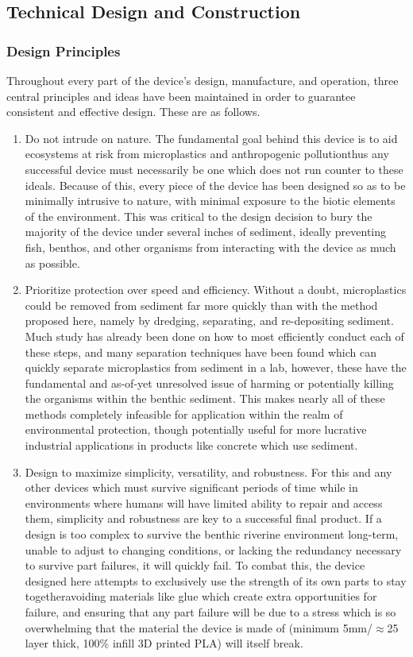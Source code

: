 \documentclass[fleqn,10pt]{SelfArx} %
\begin{document}
	\subsection{Technical Design and Construction}
	\label{subsec:TechDesign}
	\subsubsection{Design Principles}
	
	Throughout every part of the device’s design, manufacture, and operation, three central principles and ideas have been maintained in order to guarantee consistent and effective design. These are as follows.
	\begin{enumerate}
		\item Do not intrude on nature.
		\subitem The fundamental goal behind this device is to aid ecosystems at risk from microplastics and anthropogenic pollution\textemdash thus any successful device must necessarily be one which does not run counter to these ideals. Because of this, every piece of the device has been designed so as to be minimally intrusive to nature, with minimal exposure to the biotic elements of the environment. This was critical to the design decision to bury the majority of the device under several inches of sediment, ideally preventing fish, \gls{benthos}, and other organisms from interacting with the device as much as possible.
		\item Prioritize protection over speed and efficiency.
		\subitem Without a doubt, microplastics could be removed from sediment far more quickly than with the method proposed here, namely by dredging, separating, and re-depositing sediment. Much study has already been done on how to most efficiently conduct each of these steps, and many separation techniques have been found which can quickly separate microplastics from sediment in a lab, however, these have the fundamental and as-of-yet unresolved issue of harming or potentially killing the organisms within the \gls{benthic} sediment. This makes nearly all of these methods completely infeasible for application within the realm of environmental protection, though potentially useful for more lucrative industrial applications in products like concrete which use sediment. 
		\item Design to maximize simplicity, versatility, and robustness.
		\subitem For this and any other devices which must survive significant periods of time while in environments where humans will have limited ability to repair and access them, simplicity and robustness are key to a successful final product. If a design is too complex to survive the \gls{benthic} riverine environment long-term, unable to adjust to changing conditions, or lacking the redundancy necessary to survive part failures, it will quickly fail. To combat this, the device designed here attempts to exclusively use the strength of its own parts to stay together\textemdash avoiding materials like glue which create extra opportunities for failure, and ensuring that any part failure will be due to a stress which is so overwhelming that the material the device is made of (minimum 5mm/$\approx$25 layer thick, 100\% infill 3D printed PLA) will itself break. 
		

\end{enumerate}
\end{document}
